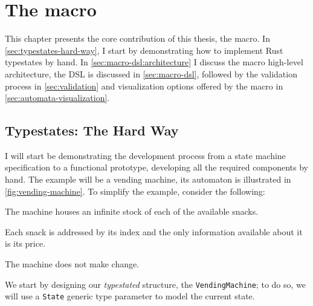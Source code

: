 

\chapter{The  macro}\label{cha:macro}

This chapter presents the core contribution of this thesis, the  macro.
In \autoref{sec:typestates-hard-way}, I start by demonstrating how to implement Rust typestates by hand.
In \autoref{sec:macro-dsl:architecture} I discuss the macro high-level architecture,
the DSL is discussed in \autoref{sec:macro-dsl},
followed by the validation process in \autoref{sec:validation} and
visualization options offered by the macro in \autoref{sec:automata-visualization}.

\section{Typestates: The Hard Way}\label{sec:typestates-hard-way}

I will start be demonstrating the development process from a state machine specification to a functional prototype,
developing all the required components by hand.
The example will be a vending machine, its automaton is illustrated in \autoref{fig:vending-machine}.
To simplify the example, consider the following:
\begin{compactitem}
    \item The machine houses an infinite stock of each of the available snacks.
    \item Each snack is addressed by its index and the only information available about it is its price.
    \item The machine does not make change.
\end{compactitem}




We start by designing our \emph{typestated} structure, the \texttt{VendingMachine};
to do so, we will use a \texttt{State} generic type parameter to model the current state.

